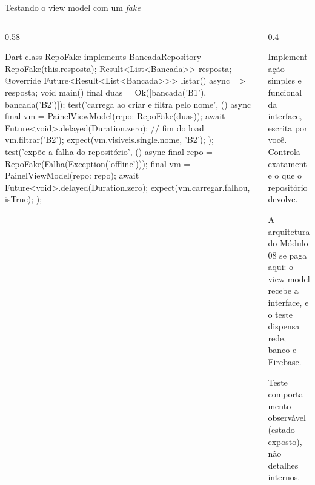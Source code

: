 \documentclass[aspectratio=169,10pt]{beamer}
\begin{document}
\begin{frame}[fragile]{Testando o view model com um \emph{fake}}
  \begin{columns}[T]
    \begin{column}{0.58\textwidth}
\begin{codigo}[title=test/ui/painel\_view\_model\_test.dart]{Dart}
class RepoFake implements BancadaRepository {
  RepoFake(this.resposta);
  Result<List<Bancada>> resposta;
  @override
  Future<Result<List<Bancada>>> listar() async => resposta;
}
void main() {
  final duas = Ok([bancada('B1'), bancada('B2')]);
  test('carrega ao criar e filtra pelo nome', () async {
    final vm = PainelViewModel(repo: RepoFake(duas));
    await Future<void>.delayed(Duration.zero);   // fim do load
    vm.filtrar('B2');
    expect(vm.visiveis.single.nome, 'B2');
  });
  test('expõe a falha do repositório', () async {
    final repo = RepoFake(Falha(Exception('offline')));
    final vm = PainelViewModel(repo: repo);
    await Future<void>.delayed(Duration.zero);
    expect(vm.carregar.falhou, isTrue);
  });
}
\end{codigo}
    \end{column}
    \begin{column}{0.4\textwidth}
      \begin{conceito}
        Implementação simples e funcional da interface, escrita por você. Controla exatamente o que o repositório devolve.
      \end{conceito}
      \begin{dica}
        A arquitetura do Módulo 08 se paga aqui: o view model recebe a interface, e o teste dispensa rede, banco e Firebase.
      \end{dica}
      \begin{atencao}
        Teste comportamento observável (estado exposto), não detalhes internos.
      \end{atencao}
    \end{column}
  \end{columns}
\end{frame}
\end{document}
